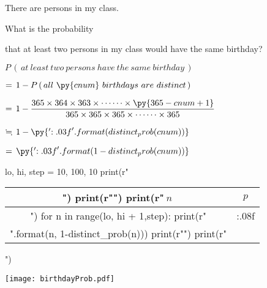 \documentclass[a4paper, 12pt]{article}
\begin{document}
    
    
    There are  persons in my class.\vspace{5mm}
    
    What is the probability
    
    \hspace{25mm} that at least two persons in my class would have the same birthday? \vspace{5mm}
       
	\hspace{15mm}$P\, (\,at~ least ~two~ persons~have~ the~same~ birthday\,)$
	
    \hspace{10mm}$= \,1 - P\, (\,all~ \py{cnum}~ birthdays~ are ~distinct\,)$\vspace{2mm}
    
   \hspace{10mm}$=\,1-\displaystyle \frac{365\times 364\times 363\times \cdots\cdots\times \py{365-cnum+1}}
            {\,365\times 365 \times 365 \times\cdots\cdots\times 365\,}$\vspace{2mm}
            
   \hspace{10mm}$\fallingdotseq \,1- \py{'{:.03f}'.format(distinct_prob(cnum))}$
   
    \hspace{10mm}$= \,\py{'{:.03f}'.format(1-distinct_prob(cnum))}$\vspace{30mm}
    
\begin{pycode}
lo, hi, step = 10, 100, 10
print(r"\begin{tabular}{|c|c|}")
print(r"\hline")
print(r"$~n~$ & $~p~$ \\ \hline")
for n in range(lo, hi + 1,step):
    print(r"{} & {:.08f} \\".format(n, 1-distinct_prob(n)))
    print(r"\hline")
print(r"\end{tabular}")
\end{pycode}   
 
      \vspace{-90mm}\hspace{40mm}
      \texttt{[image: birthdayProb.pdf]}         
\end{document}
